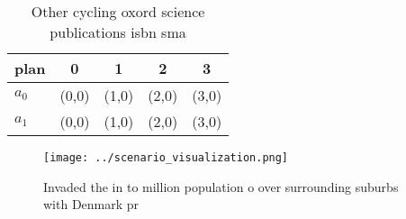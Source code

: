 \documentclass[a4paper]{article}
\begin{document}
\begin{table}
\begin{adjustbox}{width=0.7\columnwidth}
\begin{tabular}{|l|l|l|l|l|}
\hline
\textbf{plan} & \multicolumn{1}{c|}{\textbf{0}} & \multicolumn{1}{c|}{\textbf{1}} & \multicolumn{1}{c|}{\textbf{2}} & \multicolumn{1}{c|}{\textbf{3}} \\ \hline
\textbf{$a_0$}  & (0,0) & (1,0) & (2,0) & (3,0) \\ \hline
\textbf{$a_1$}  & (0,0) & (1,0) & (2,0) & (3,0) \\ \hline
\end{tabular}
\end{adjustbox}
\caption{Other cycling oxord science publications isbn sma
}
\end{table}

\begin{figure}
\centering
\texttt{[image: ../scenario\_visualization.png]}
\caption{Invaded the in to million population o over surrounding suburbs with Denmark pr
}
\end{figure}
 
\end{document}
